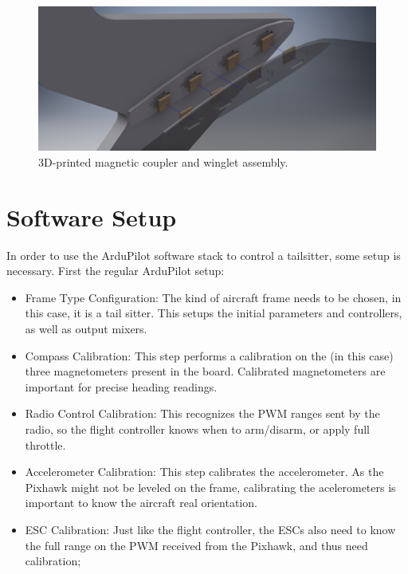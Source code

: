 \begin{figure}[H]
\centering
  \includegraphics[width=\linewidth]{figs/magnetassembly.png}
  \caption{3D-printed magnetic coupler and winglet assembly.}
  \label{fig:magnetcoupler2}
\end{figure}
	

\section{Software Setup}

In order to use the ArduPilot software stack to control a tailsitter, some setup is necessary. First the regular ArduPilot setup:
\begin{itemize}
\item Frame Type Configuration: The kind of aircraft frame needs to be chosen, in this case, it is a tail sitter. This setups the initial parameters and controllers, as well as output mixers.

\item Compass Calibration: This step performs a calibration on the (in this case) three magnetometers present in the board. Calibrated magnetometers are important for precise heading readings.

\item Radio Control Calibration: This recognizes the PWM ranges sent by the radio, so the flight controller knows when to arm/disarm, or apply full throttle.
\item Accelerometer Calibration: This step calibrates the accelerometer. As the Pixhawk might not be leveled on the frame, calibrating the acelerometers is important to know the aircraft real orientation.
\item ESC Calibration: Just like the flight controller, the ESCs also need to know the full range on the PWM received from the Pixhawk, and thus need calibration;
\end{itemize}


